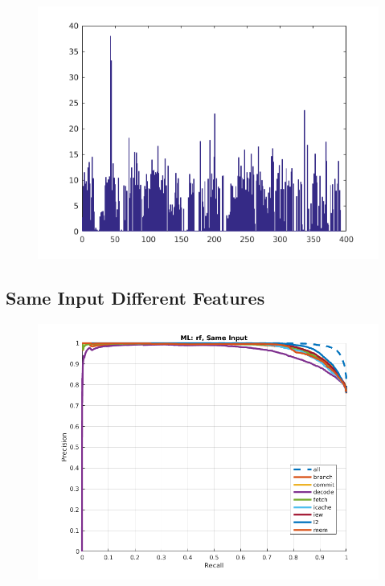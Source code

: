\documentclass{sig-alternate}
\begin{document}
\begin{figure}[t]
\begin{center}
   \includegraphics[width=0.95\linewidth]{./figures/feat_same.png}
\end{center}
   \caption{}
\label{fig:feat-same}
\end{figure}

\subsection{Same Input Different Features}

\begin{figure}[t]
\begin{center}
   \includegraphics[width=0.95\linewidth]{./figures/sidf.png}
\end{center}
   \caption{}
\label{fig:sidf}
\end{figure}
\end{document}
